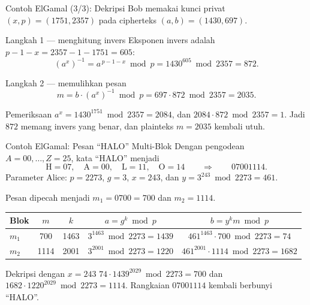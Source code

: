 \documentclass[aspectratio=169,11pt]{beamer}
\begin{document}
\begin{frame}{Contoh ElGamal (3/3): Dekripsi}
    \footnotesize
    Bob memakai kunci privat $(x,p) = (1751, 2357)$ pada cipherteks
    $(a,b) = (1430,697)$.
    \vspace{0.1cm}
    \begin{block}{Langkah 1 --- menghitung invers}
        \footnotesize
        Eksponen invers adalah $p-1-x = 2357-1-1751 = 605$:
        \[
            (a^{x})^{-1} = a^{\,p-1-x} \bmod p
            = 1430^{605} \bmod 2357 = 872 .
        \]
    \end{block}
    \begin{block}{Langkah 2 --- memulihkan pesan}
        \footnotesize
        \[
            m = b \cdot (a^{x})^{-1} \bmod p
              = 697 \cdot 872 \bmod 2357 = 2035 .
        \]
    \end{block}
    \begin{exampleblock}{Pemeriksaan}
        \footnotesize
        $a^{x} = 1430^{1751} \bmod 2357 = 2084$, dan
        $2084 \cdot 872 \bmod 2357 = 1$. Jadi $872$ memang invers yang
        benar, dan plainteks $m = 2035$ kembali utuh.
    \end{exampleblock}
\end{frame}

\begin{frame}{Contoh ElGamal: Pesan ``HALO'' Multi-Blok}
    \footnotesize
    Dengan pengodean $A = 00, \dots, Z = 25$, kata ``HALO'' menjadi
    \[
        \mathrm{H}=07,\quad \mathrm{A}=00,\quad \mathrm{L}=11,\quad
        \mathrm{O}=14
        \qquad \Longrightarrow \qquad 07001114 .
    \]
    Parameter Alice: $p = 2273$, $g = 3$, $x = 243$, dan
    $y = 3^{243} \bmod 2273 = 461$.

    Pesan dipecah menjadi $m_1 = 0700 = 700$ dan $m_2 = 1114$.
    \vspace{0.1cm}
    \centering
    \begin{tabular}{@{}l c c c c@{}}
        \toprule
        Blok & $m$ & $k$ & $a = g^{k} \bmod p$ & $b = y^{k}m \bmod p$ \\
        \midrule
        $m_1$ & 700  & 1463 & $3^{1463} \bmod 2273 = 1439$
              & $461^{1463} \cdot 700 \bmod 2273 = 74$ \\
        \addlinespace
        $m_2$ & 1114 & 2001 & $3^{2001} \bmod 2273 = 1220$
              & $461^{2001} \cdot 1114 \bmod 2273 = 1682$ \\
        \bottomrule
    \end{tabular}
    \vspace{0.12cm}
    \begin{exampleblock}{Dekripsi dengan $x = 243$}
        \footnotesize
        $74 \cdot 1439^{2029} \bmod 2273 = 700$ dan
        $1682 \cdot 1220^{2029} \bmod 2273 = 1114$. Rangkaian
        $07001114$ kembali berbunyi ``HALO''.
    \end{exampleblock}
\end{frame}
\end{document}
